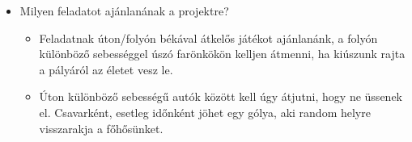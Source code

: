 \begin{itemize}
\item Milyen feladatot ajánlanának a projektre?%
\begin{itemize}
\item Feladatnak úton/folyón békával átkelős játékot ajánlanánk, a folyón különböző sebességgel úszó farönkökön kelljen átmenni, ha kiúszunk rajta a pályáról az életet vesz le.
\item Úton különböző sebességű autók között kell úgy átjutni, hogy ne üssenek el. Csavarként, esetleg időnként jöhet egy gólya, aki random helyre visszarakja a főhősünket.
\end{itemize}
\end{itemize}

